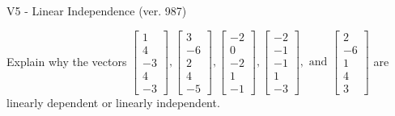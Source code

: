 \begin{exercise}
  \begin{exerciseTitle}V5 - Linear Independence (ver. 987)\end{exerciseTitle}
  \begin{exerciseStatement}
    Explain why the vectors \(\left[\begin{array}{r}
1 \\
4 \\
-3 \\
4 \\
-3
\end{array}\right] , \left[\begin{array}{r}
3 \\
-6 \\
2 \\
4 \\
-5
\end{array}\right] , \left[\begin{array}{r}
-2 \\
0 \\
-2 \\
1 \\
-1
\end{array}\right] , \left[\begin{array}{r}
-2 \\
-1 \\
-1 \\
1 \\
-3
\end{array}\right] , \text{ and } \left[\begin{array}{r}
2 \\
-6 \\
1 \\
4 \\
3
\end{array}\right]\) are linearly dependent or linearly independent.	



\end{exerciseStatement}
\end{exercise}
